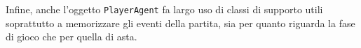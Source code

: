 %
%         
%         
%
%


\noindent
Infine, anche l'oggetto \texttt{PlayerAgent} fa largo uso di classi di supporto utili soprattutto a memorizzare gli eventi della partita, sia per quanto riguarda la fase di gioco che per quella di asta.
